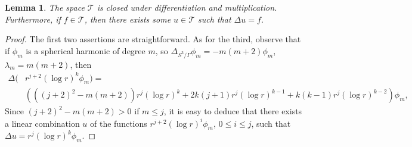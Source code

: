 \documentclass[12pt]{article}
\newtheorem{lem}[thm]{Lemma}
\newtheorem{defn}[thm]{Definition}
\newcommand{\calT}{{\mathcal T}}
\begin{document}
\begin{lem}\label{stability T}
The space $\calT$ is closed under differentiation and multiplication. Furthermore, if $f \in \calT$, then there exists some
$u \in \calT$ such that $\Delta u = f$. 
\end{lem}
\begin{proof}
The first two assertions are straightforward.  As for the third, observe that if $\phi_m$ is a spherical harmonic of degree $m$,
so $\Delta_{S^3/\Gamma} \phi_m = - m(m+2) \phi_m$, $\lambda_m = m (m+2)$, then
\begin{equation}
\begin{split}
\Delta ( & r^{j+2}(\log r)^k \phi_m) = \\
& \left( (  (j+2)^2-m(m+2)) r^j (\log r)^k + 2 k (j+1) r^j (\log r)^{k-1} + k(k-1) r^j (\log r)^{k-2}\right) \phi_m,
\end{split}
\label{laplacien phg}
\end{equation}
Since $(j+2)^2 - m(m+2) > 0$ if $m \leq j$, it is easy to deduce that there exists a linear combination $u$ of
the functions $r^{j+2} (\log r)^i \phi_m$, $0 \leq i \leq j$, such that $\Delta u = r^j (\log r)^k \phi_m$. 
\end{proof}



        
     
\end{document}
